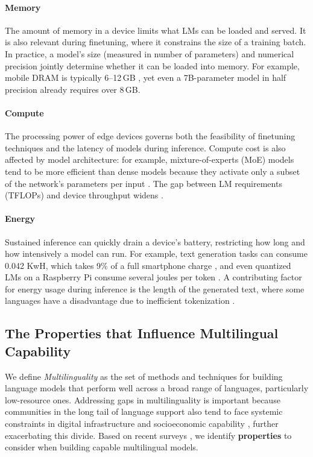 \documentclass[11pt,a4paper]{article}
\begin{document}
\paragraph{\iconmemory{} Memory}
The amount of memory in a device limits what LMs can be loaded and served.
It is also relevant during finetuning, where it constrains the size of a training batch.
In practice, a model's size (measured in number of parameters) and numerical precision jointly determine whether it can be loaded into memory.
For example, mobile DRAM is typically 6--12\,GB \citep{liu2024mobileLLM}, yet even a 7B-parameter model in half precision already requires over 8\,GB.

\paragraph{\iconcompute{} Compute}
The processing power of edge devices governs both the feasibility of finetuning techniques and the latency of models during inference.
Compute cost is also affected by model architecture: for example, mixture-of-experts (MoE) models tend to be more efficient than dense models because they activate only a subset of the network's parameters per input \citep{muennighoff2025olmoe}.
The gap between LM requirements (TFLOPs) and device throughput widens \citep{zheng2025reviewedgeLLM}.

\paragraph{\iconenergy{} Energy}
Sustained inference can quickly drain a device's battery, restricting how long and how intensively a model can run.
For example, text generation tasks can consume 0.042 KwH, which takes 9\% of a full smartphone charge \citep{luccioni-etal-2024-power},
and even quantized LMs on a Raspberry Pi consume several joules per token \citep{husom-etal-2025-sustainable}.
A contributing factor for energy usage during inference is the length of the generated text, where some languages have a disadvantage due to inefficient tokenization \citep{ahia2023do}.

\subsection{The Properties that Influence Multilingual Capability}
\label{sec:multilingual_constraints}

We define \textit{Multilinguality} as the set of methods and techniques for building language models that perform well across a broad range of languages, particularly low-resource ones.
Addressing gaps in multilinguality is important because communities in the long tail of language support also tend to face systemic constraints in digital infrastructure and socioeconomic capability \citep{occhini2026artificialintelligencecreatingnew}, further exacerbating this divide.
Based on recent surveys \citep{liu-etal-2025-culturally,longpre2025atlasadaptivetransferscaling}, we identify \textbf{properties} to consider when building capable multilingual models.
\end{document}
